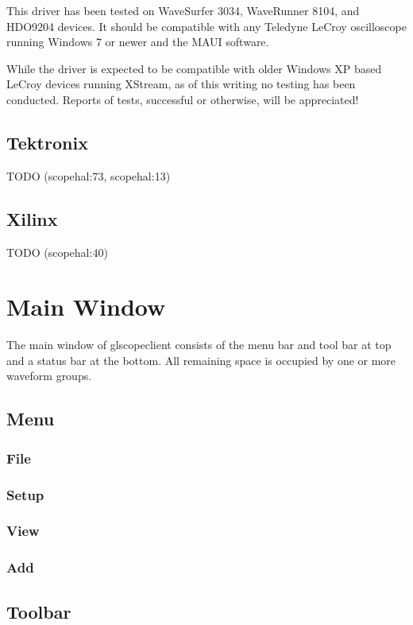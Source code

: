 \documentclass[11pt]{article}
\begin{document}
This driver has been tested on WaveSurfer 3034, WaveRunner 8104, and HDO9204 devices. It should be compatible with any
Teledyne LeCroy oscilloscope running Windows 7 or newer and the MAUI software.

While the driver is expected to be compatible with older Windows XP based LeCroy devices running XStream, as of this
writing no testing has been conducted. Reports of tests, successful or otherwise, will be appreciated!

\subsection{Tektronix}
TODO (scopehal:73, scopehal:13)

\subsection{Xilinx}
TODO (scopehal:40)

\pagebreak
\section{Main Window}

The main window of glscopeclient consists of the menu bar and tool bar at top and a status bar at the bottom. All
remaining space is occupied by one or more waveform groups.

\subsection{Menu}

\subsubsection{File}

\subsubsection{Setup}

\subsubsection{View}

\subsubsection{Add}

\subsection{Toolbar}
\end{document}
